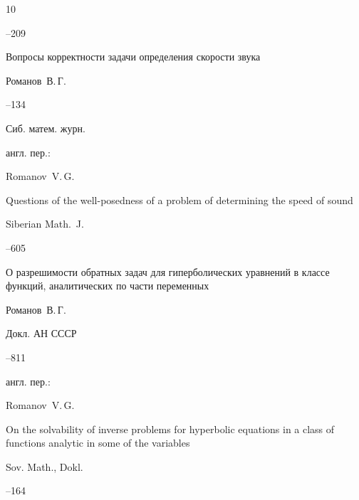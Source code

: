 \begin{thebibliography}{10}



–209 








\paper Вопросы корректности задачи определения скорости звука

\by Романов~В.\,Г.




--134

\jour Сиб. матем. журн.

\transl англ. пер.:~

\by Romanov~V.\,G.

\paper  Questions of the well-posedness of a problem of determining the speed of sound

\jour  Siberian Math.~J. 




–605 








\paper О разрешимости обратных задач для  гиперболических уравнений в классе функций, аналитических по части переменных

\by Романов~В.\,Г.

\jour Докл. АН СССР




--811

\transl англ. пер.:~

\by Romanov~V.\,G.

\paper On the solvability of inverse problems for hyperbolic equations in a class of functions analytic in some of the variables

\jour Sov. Math., Dokl. 



--164 







\end{thebibliography}
